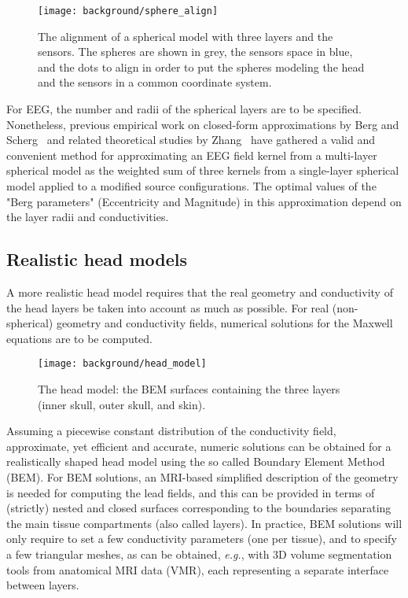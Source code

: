 \begin{figure}
\centering
	\texttt{[image: background/sphere\_align]}
    \caption{The alignment of a spherical model with three layers and the sensors. The spheres are shown in grey, the sensors space in blue, and the dots to align in order to put the spheres modeling the head and the sensors in a common coordinate system.}
	\label{fig:sphere_align}
\end{figure}

For EEG, the number and radii of the spherical layers are to be specified. Nonetheless, previous empirical work on closed-form approximations by Berg and Scherg~\cite{berg1994fast} and related theoretical studies by Zhang~\cite{zhang1995fast} have gathered a valid and convenient method for approximating an EEG field kernel from a multi-layer spherical model as the weighted sum of three kernels from a single-layer spherical model applied to a modified source configurations. The optimal values of the "Berg parameters" (Eccentricity and Magnitude) in this approximation depend on the layer radii and conductivities.

\subsection*{Realistic head models}
A more realistic head model requires that the real geometry and conductivity of the head layers be taken into account as much as possible. For real (non-spherical) geometry and conductivity fields, numerical solutions for the Maxwell equations are to be computed.\\
\begin{figure}
\centering
	\texttt{[image: background/head\_model]}
    \caption{The head model: the BEM surfaces containing the three layers (inner skull, outer skull, and skin).}
	\label{fig:head_model}
\end{figure}
Assuming a piecewise constant distribution of the conductivity field, approximate, yet efficient and accurate, numeric solutions can be obtained for a realistically shaped head model using the so called Boundary Element Method (BEM). For BEM solutions, an MRI-based simplified description of the geometry is needed for computing the lead fields, and this can be provided in terms of (strictly) nested and closed surfaces corresponding to the boundaries separating the main tissue compartments (also called layers).
In practice, BEM solutions will only require to set a few conductivity parameters (one per tissue), and to specify a few triangular meshes, as can be obtained, \textit{e.g.}, with 3D volume segmentation tools from anatomical MRI data (VMR), each representing a separate interface between layers. \\



